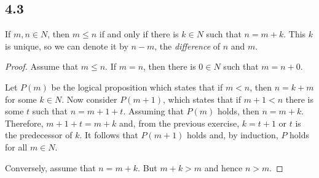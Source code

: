 \subsection*{4.3} If $m,n \in N$, then $m \leq n$ if and only if there is $k \in N$ such that $n = m+k$. This $k$ is unique, so we can denote it by $n - m$, the \textit{difference} of $n$ and $m$.

\begin{proof}
Assume that $m \leq n$. If $m = n$, then there is $0 \in N$ such that $m = n + 0$.

Let $P(m)$ be the logical proposition which states that if $m < n$, then $n = k+m$ for some $k \in N$. Now consider $P(m+1)$, which states that if $m+1 < n$ there is some $t$ such that $n = m+1+t$. Assuming that $P(m)$ holds, then $n = m + k$. Therefore, $m + 1 + t = m + k$ and, from the previous exercise, $k = t+1$ or $t$ is the predecessor of $k$. It follows that $P(m+1)$ holds and, by induction, $P$ holds for all $m \in N$.

Conversely, assume that $n = m + k$. But $m + k > m$ and hence $n > m$. 
\end{proof}

\newpage

